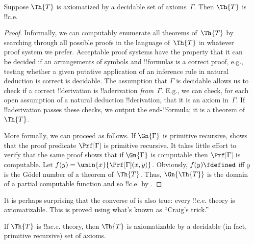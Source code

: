 \documentclass[../../../include/open-logic-section]{subfiles}
\begin{document}
\begin{prop} Suppose $\Th{T}$ is
axiomatized by a decidable set of axioms~$\Gamma$. Then $\Th{T}$ is
!!{c.e.}
\end{prop}

\begin{proof}
  Informally, we can computably enumerate all theorems of~$\Th{T}$ by
  searching through all possible proofs in the language
  of~$\Th{T}$ in whatever proof system we prefer. Acceptable proof
  systems have the property that it can be decided if an arrangements
  of symbols and !!{formula}s is a correct proof, e.g., testing whether
  a given putative application of an inference rule in natural deduction is
  correct is decidable. The assumption that $\Gamma$ is decidable
  allows us to check if a correct !!{derivation} is !!a{derivation}
  \emph{from}~$\Gamma$. E.g., we can check, for each open assumption
  of a natural deduction !!{derivation}, that it is an axiom in~$\Gamma$.
  If !!a{derivation} passes these checks, we output the end-!!{formula}; it
  is a theorem of~$\Th{T}$.

  More formally, we can proceed as follows. If $\Gn{\Gamma}$ is
  primitive recursive,  shows
  that the proof predicate $\Prf[\Gamma]$ is primitive recursive. It
  takes little effort to verify that the same proof shows that if
  $\Gn{\Gamma}$ is computable then $\Prf[\Gamma]$ is computable. Let
  $f(y) = \umin{x}{\Prf[\Gamma](x,y)}$. Obviously, $f(y)\fdefined$ iff
  $y$ is the G\"odel number of a theorem of~$\Th{T}$. Thus,
  $\Gn{\Th{T}}$ is the domain of a partial computable function and so
  !!{c.e.} by .
\end{proof}

It is perhaps surprising that the converse of
 is also true: every !!{c.e.} theory is
axiomatizable. This is proved using what's known as ``Craig's trick.''

\begin{prop}
If\/ $\Th{T}$ is !!a{c.e.} theory, then $\Th{T}$ is axiomatizable by a
decidable (in fact, primitive recursive) set of axioms.
\end{prop}
\end{document}
